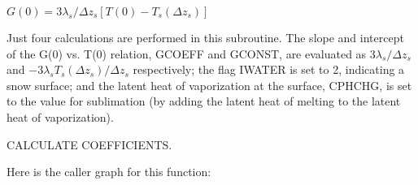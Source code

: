 $G(0) = 3 \lambda_s / \Delta z_s [T(0) - T_s(\Delta z_s)]$

Just four calculations are performed in this subroutine. The slope and intercept of the G(0) vs. T(0) relation, G\+C\+O\+E\+F\+F and G\+C\+O\+N\+S\+T, are evaluated as $3 \lambda_s / \Delta z_s$ and $-3 \lambda_s T_s(\Delta z_s)/ \Delta z_s$ respectively; the flag I\+W\+A\+T\+E\+R is set to 2, indicating a snow surface; and the latent heat of vaporization at the surface, C\+P\+H\+C\+H\+G, is set to the value for sublimation (by adding the latent heat of melting to the latent heat of vaporization).


\begin{DoxyItemize}
\item C\+A\+L\+C\+U\+L\+A\+T\+E C\+O\+E\+F\+F\+I\+C\+I\+E\+N\+T\+S.
\end{DoxyItemize}

Here is the caller graph for this function\+:


